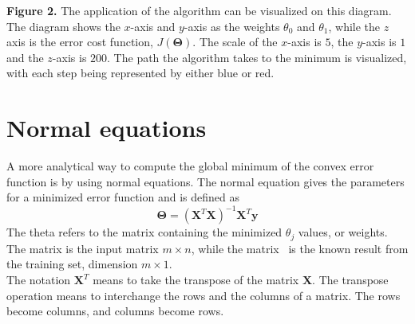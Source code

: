 \documentclass[a4paper,12pt]{article}
\begin{document}
\textbf{Figure 2.} The application of the algorithm can be visualized on this diagram. The diagram shows the $x$-axis and $y$-axis as the weights $\theta_0$ and $\theta_1$, while the $z$ axis is the error cost function, $J(\boldsymbol{\Theta})$. The scale of the $x$-axis is $5$, the $y$-axis is $1$ and the $z$-axis is $200$. The path the algorithm takes to the minimum is visualized, with each step being represented by either blue or red.
\\
\section{Normal equations}
A more analytical way to compute the global minimum of the convex error function is by using normal equations. The normal equation gives the parameters for a minimized error function and is defined as \cite{normal}
\[\boldsymbol{\Theta} = (\boldsymbol{X}^T\boldsymbol{X})^{-1}\boldsymbol{X}^T\boldsymbol{y}\]
The theta refers to the matrix containing the minimized \(\theta_j\) values, or weights. The matrix  is the input matrix $m \times n$, while the matrix  \ is the known result from the training set, dimension $m \times 1$. 
\\

The notation $\boldsymbol{X}^T$ means to take the transpose of the matrix $\boldsymbol{X}$. The transpose operation means to interchange the rows and the columns of a matrix. The rows become columns, and columns become rows. 
\\
\end{document}
